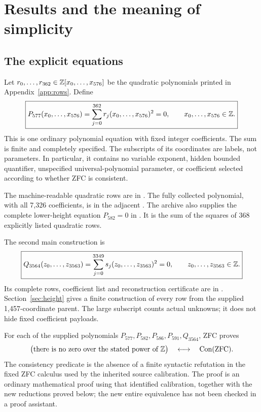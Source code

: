 \section{Results and the meaning of simplicity}
\subsection{The explicit equations}

Let \(r_0,\ldots,r_{362}\in\mathbb Z[x_0,\ldots,x_{576}]\) be the quadratic polynomials printed in Appendix~\ref{app:rows}. Define
\begin{equation}\label{eq:main}
\boxed{\displaystyle P_{577}(x_0,\ldots,x_{576})=
\sum_{j=0}^{362}r_j(x_0,\ldots,x_{576})^2=0,
\qquad x_0,\ldots,x_{576}\in\mathbb Z.}
\end{equation}
This is one ordinary polynomial equation with fixed integer coefficients. The sum is finite and completely specified. The subscripts of its coordinates are labels, not parameters. In particular, it contains no variable exponent, hidden bounded quantifier, unspecified universal-polynomial parameter, or coefficient selected according to whether ZFC is consistent.

The machine-readable quadratic rows are in . The fully collected polynomial, with all 7,326 coefficients, is in the adjacent . The archive also supplies the complete lower-height equation \(P_{582}=0\) in . It is the sum of the squares of 368 explicitly listed quadratic rows.

The second main construction is
\begin{equation}\label{eq:heighttwo}
\boxed{\displaystyle Q_{3564}(z_0,\ldots,z_{3563})=
\sum_{j=0}^{3349}s_j(z_0,\ldots,z_{3563})^2=0,
\qquad z_0,\ldots,z_{3563}\in\mathbb Z.}
\end{equation}
Its complete rows, coefficient list and reconstruction certificate are in . Section~\ref{sec:height} gives a finite construction of every row from the supplied 1,457-coordinate parent. The large subscript counts actual unknowns; it does not hide fixed coefficient payloads.

\begin{theorem}\label{thm:endpoint}
For each of the supplied polynomials \(P_{577},P_{582},P_{586},P_{591},Q_{3564}\), ZFC proves
\[
\bigl(\text{there is no zero over the stated power of }\mathbb Z\bigr)
\quad\longleftrightarrow\quad\operatorname{Con}(\mathrm{ZFC}).
\]
The consistency predicate is the absence of a finite syntactic refutation in the fixed ZFC calculus used by the inherited source calibration. The proof is an ordinary mathematical proof using that identified calibration, together with the new reductions proved below; the new entire equivalence has not been checked in a proof assistant.
\end{theorem}

